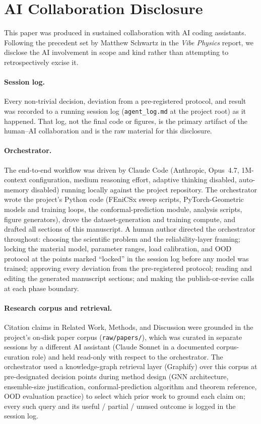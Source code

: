 \section*{AI Collaboration Disclosure}

This paper was produced in sustained collaboration with AI coding
assistants. Following the precedent set by Matthew Schwartz in the
\emph{Vibe Physics} report, we disclose the AI involvement in scope
and kind rather than attempting to retrospectively excise it.

\paragraph{Session log.}
Every non-trivial decision, deviation from a pre-registered protocol, and
result was recorded to a running session log (\texttt{agent\_log.md} at
the project root) as it happened. That log, not the final code or
figures, is the primary artifact of the human--AI collaboration and is
the raw material for this disclosure.

\paragraph{Orchestrator.}
The end-to-end workflow was driven by Claude Code (Anthropic, Opus~4.7,
1M-context configuration, medium reasoning effort, adaptive thinking
disabled, auto-memory disabled) running locally against the project
repository. The orchestrator wrote the project's Python code (FEniCSx
sweep scripts, PyTorch-Geometric models and training loops, the
conformal-prediction module, analysis scripts, figure generators), drove
the dataset-generation and training compute, and drafted all sections of
this manuscript. A human author directed the orchestrator throughout:
choosing the scientific problem and the reliability-layer framing;
locking the material model, parameter ranges, load calibration, and OOD
protocol at the points marked ``locked'' in the session log before any
model was trained; approving every deviation from the pre-registered
protocol; reading and editing the generated manuscript sections; and
making the publish-or-revise calls at each phase boundary.

\paragraph{Research corpus and retrieval.}
Citation claims in Related Work, Methods, and Discussion were grounded
in the project's on-disk paper corpus (\texttt{raw/papers/}), which was
curated in separate sessions by a different AI assistant (Claude Sonnet
in a documented corpus-curation role) and held read-only with respect to
the orchestrator. The orchestrator used a knowledge-graph retrieval layer
(Graphify) over this corpus at pre-designated decision points during
method design (GNN architecture, ensemble-size justification,
conformal-prediction algorithm and theorem reference, OOD evaluation
practice) to select which prior work to ground each claim on; every
such query and its useful / partial / unused outcome is logged in the
session log.

